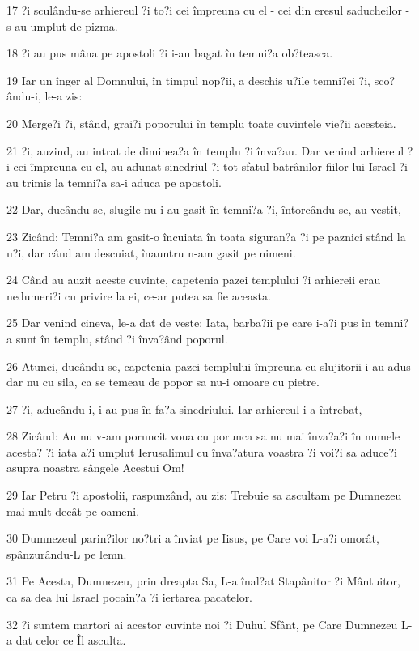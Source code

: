 \par 17 ?i sculându-se arhiereul ?i to?i cei împreuna cu el - cei din eresul saducheilor - s-au umplut de pizma.
\par 18 ?i au pus mâna pe apostoli ?i i-au bagat în temni?a ob?teasca.
\par 19 Iar un înger al Domnului, în timpul nop?ii, a deschis u?ile temni?ei ?i, sco?ându-i, le-a zis:
\par 20 Merge?i ?i, stând, grai?i poporului în templu toate cuvintele vie?ii acesteia.
\par 21 ?i, auzind, au intrat de diminea?a în templu ?i înva?au. Dar venind arhiereul ?i cei împreuna cu el, au adunat sinedriul ?i tot sfatul batrânilor fiilor lui Israel ?i au trimis la temni?a sa-i aduca pe apostoli.
\par 22 Dar, ducându-se, slugile nu i-au gasit în temni?a ?i, întorcându-se, au vestit,
\par 23 Zicând: Temni?a am gasit-o încuiata în toata siguran?a ?i pe paznici stând la u?i, dar când am descuiat, înauntru n-am gasit pe nimeni.
\par 24 Când au auzit aceste cuvinte, capetenia pazei templului ?i arhiereii erau nedumeri?i cu privire la ei, ce-ar putea sa fie aceasta.
\par 25 Dar venind cineva, le-a dat de veste: Iata, barba?ii pe care i-a?i pus în temni?a sunt în templu, stând ?i înva?ând poporul.
\par 26 Atunci, ducându-se, capetenia pazei templului împreuna cu slujitorii i-au adus dar nu cu sila, ca se temeau de popor sa nu-i omoare cu pietre.
\par 27 ?i, aducându-i, i-au pus în fa?a sinedriului. Iar arhiereul i-a întrebat,
\par 28 Zicând: Au nu v-am poruncit voua cu porunca sa nu mai înva?a?i în numele acesta? ?i iata a?i umplut Ierusalimul cu înva?atura voastra ?i voi?i sa aduce?i asupra noastra sângele Acestui Om!
\par 29 Iar Petru ?i apostolii, raspunzând, au zis: Trebuie sa ascultam pe Dumnezeu mai mult decât pe oameni.
\par 30 Dumnezeul parin?ilor no?tri a înviat pe Iisus, pe Care voi L-a?i omorât, spânzurându-L pe lemn.
\par 31 Pe Acesta, Dumnezeu, prin dreapta Sa, L-a înal?at Stapânitor ?i Mântuitor, ca sa dea lui Israel pocain?a ?i iertarea pacatelor.
\par 32 ?i suntem martori ai acestor cuvinte noi ?i Duhul Sfânt, pe Care Dumnezeu L-a dat celor ce Îl asculta.
